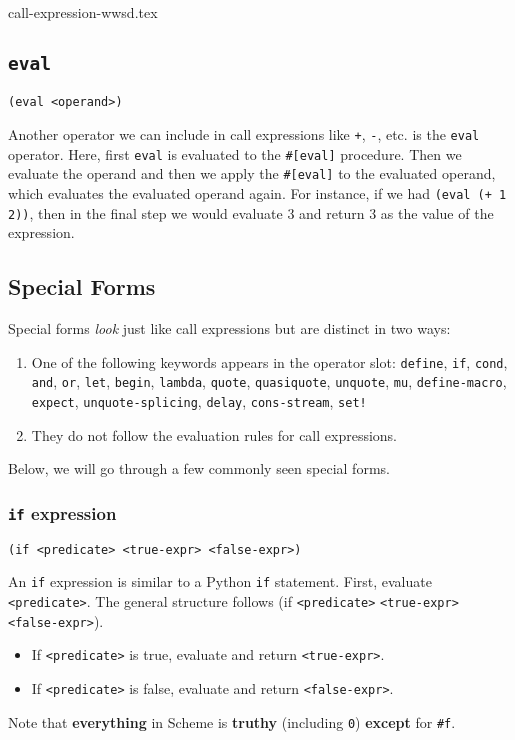 {call-expression-wwsd.tex}

\subsection{\lstinline{eval}}
\begin{lstlisting}
(eval <operand>)
\end{lstlisting}
Another operator we can include in call expressions like \lstinline{+}, \lstinline{-}, etc. is the \lstinline{eval} operator. Here, first \lstinline{eval} is evaluated to the \lstinline{#[eval]} procedure. Then we evaluate the operand and then we apply the \lstinline{#[eval]} to the evaluated operand, which evaluates the evaluated operand again. For instance, if we had \lstinline{(eval (+ 1 2))}, then in the final step we would evaluate 3 and return 3 as the value of the expression.

\subsection{Special Forms}

Special forms \textit{look} just like call expressions but are distinct in two ways: 
\begin{enumerate}
    \item One of the following keywords appears in the operator slot: \lstinline{define}, \lstinline{if}, \lstinline{cond}, \lstinline{and}, \lstinline{or}, \lstinline{let}, \lstinline{begin}, \lstinline{lambda}, \lstinline{quote}, \lstinline{quasiquote}, \lstinline{unquote}, \lstinline{mu}, \lstinline{define-macro}, \lstinline{expect}, \lstinline{unquote-splicing}, \lstinline{delay}, \lstinline{cons-stream}, \lstinline{set!}
    \item They do not follow the evaluation rules for call expressions.
\end{enumerate}

Below, we will go through a few commonly seen special forms. 

\subsubsection{\lstinline{if} expression}
\begin{lstlisting}
(if <predicate> <true-expr> <false-expr>)
\end{lstlisting}

An \lstinline{if} expression is similar to a Python \lstinline{if} statement. First, evaluate \lstinline{<predicate>}. The general structure follows (if \lstinline{<predicate>} \lstinline{<true-expr>} \lstinline{<false-expr>}).
\begin{itemize}
    \item If \lstinline{<predicate>} is true, evaluate and return \lstinline{<true-expr>}.
    \item If \lstinline{<predicate>} is false, evaluate and return \lstinline{<false-expr>}.
\end{itemize}
Note that \textbf{everything} in Scheme is \textbf{truthy} (including \lstinline{0}) \textbf{except} for \lstinline{#f}. 

